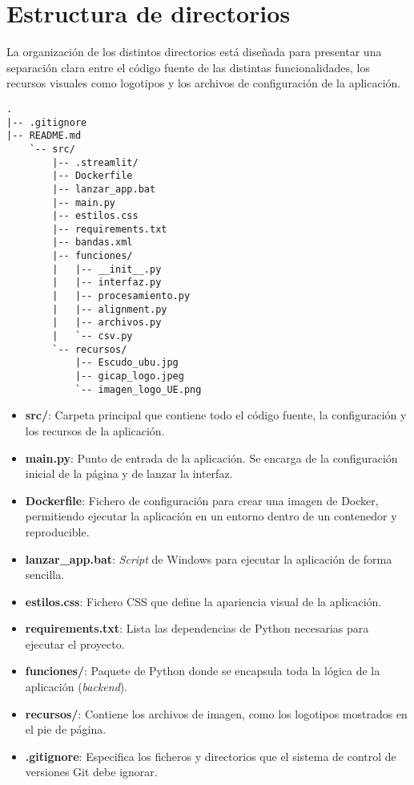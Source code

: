 \section{Estructura de directorios}
La organización de los distintos directorios está diseñada para presentar una separación clara entre el código fuente de las distintas funcionalidades, los recursos visuales como logotipos y los archivos de configuración de la aplicación.
\newpage
\begin{verbatim}
.
|-- .gitignore
|-- README.md
    `-- src/
        |-- .streamlit/
        |-- Dockerfile
        |-- lanzar_app.bat
        |-- main.py
        |-- estilos.css
        |-- requirements.txt
        |-- bandas.xml
        |-- funciones/
        |   |-- __init__.py
        |   |-- interfaz.py
        |   |-- procesamiento.py
        |   |-- alignment.py
        |   |-- archivos.py
        |   `-- csv.py
        `-- recursos/
            |-- Escudo_ubu.jpg
            |-- gicap_logo.jpeg
            `-- imagen_logo_UE.png
    \end{verbatim}
\begin{itemize}
\item \textbf{src/}: Carpeta principal que contiene todo el código fuente, la configuración y los recursos de la aplicación.
\item \textbf{main.py}: Punto de entrada de la aplicación. Se encarga de la configuración inicial de la página y de lanzar la interfaz.
\item \textbf{Dockerfile}: Fichero de configuración para crear una imagen de Docker, permitiendo ejecutar la aplicación en un entorno dentro de un contenedor y reproducible.
\item \textbf{lanzar\_app.bat}: \textit{Script} de Windows para ejecutar la aplicación de forma sencilla.
\item \textbf{estilos.css}: Fichero CSS que define la apariencia visual de la aplicación.
\item \textbf{requirements.txt}: Lista las dependencias de Python necesarias para ejecutar el proyecto.
\item \textbf{funciones/}: Paquete de Python donde se encapsula toda la lógica de la aplicación (\textit{backend}).
\item \textbf{recursos/}: Contiene los archivos de imagen, como los logotipos mostrados en el pie de página.
\item \textbf{.gitignore}: Especifica los ficheros y directorios que el sistema de control de versiones Git debe ignorar.
\end{itemize}

